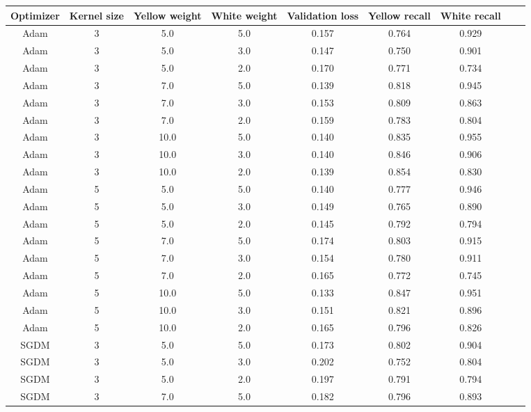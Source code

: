 \begin{table}[h]
    \centering 
    \begin{tabular}{|c|c|c|c|c|c|c|c|c|}
        \hline
        Optimizer & Kernel size & Yellow weight & White weight & Validation loss & Yellow recall & White recall \\ \hline
        Adam & 3 & 5.0 & 5.0 & 0.157 & 0.764 & 0.929 \\ \hline
        Adam & 3 & 5.0 & 3.0 & 0.147 & 0.750 & 0.901 \\ \hline
        Adam & 3 & 5.0 & 2.0 & 0.170 & 0.771 & 0.734 \\ \hline
        Adam & 3 & 7.0 & 5.0 & 0.139 & 0.818 & 0.945 \\ \hline
        Adam & 3 & 7.0 & 3.0 & 0.153 & 0.809 & 0.863 \\ \hline
        Adam & 3 & 7.0 & 2.0 & 0.159 & 0.783 & 0.804 \\ \hline
        Adam & 3 & 10.0 & 5.0 & 0.140 & 0.835 & 0.955 \\ \hline
        Adam & 3 & 10.0 & 3.0 & 0.140 & 0.846 & 0.906 \\ \hline
        Adam & 3 & 10.0 & 2.0 & 0.139 & 0.854 & 0.830 \\ \hline
        Adam & 5 & 5.0 & 5.0 & 0.140 & 0.777 & 0.946 \\ \hline
        Adam & 5 & 5.0 & 3.0 & 0.149 & 0.765 & 0.890 \\ \hline
        Adam & 5 & 5.0 & 2.0 & 0.145 & 0.792 & 0.794 \\ \hline
        Adam & 5 & 7.0 & 5.0 & 0.174 & 0.803 & 0.915 \\ \hline
        Adam & 5 & 7.0 & 3.0 & 0.154 & 0.780 & 0.911 \\ \hline
        Adam & 5 & 7.0 & 2.0 & 0.165 & 0.772 & 0.745 \\ \hline
        Adam & 5 & 10.0 & 5.0 & 0.133 & 0.847 & 0.951 \\ \hline
        Adam & 5 & 10.0 & 3.0 & 0.151 & 0.821 & 0.896 \\ \hline
        Adam & 5 & 10.0 & 2.0 & 0.165 & 0.796 & 0.826 \\ \hline
        SGDM & 3 & 5.0 & 5.0 & 0.173 & 0.802 & 0.904 \\ \hline
        SGDM & 3 & 5.0 & 3.0 & 0.202 & 0.752 & 0.804 \\ \hline
        SGDM & 3 & 5.0 & 2.0 & 0.197 & 0.791 & 0.794 \\ \hline
        SGDM & 3 & 7.0 & 5.0 & 0.182 & 0.796 & 0.893 \\ \hline

\end{tabular}
\end{table}
